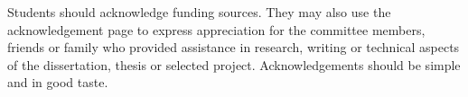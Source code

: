 \begin{acknowledgments}
Students should acknowledge funding sources. They may also use the
acknowledgement page to express appreciation for the committee members, friends
or family who provided assistance in research, writing or technical aspects of
the dissertation, thesis or selected project. Acknowledgements should be simple
and in good taste.
\end{acknowledgments}
